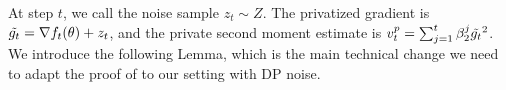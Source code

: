 \documentclass[letterpaper]{article} %
\newtheorem{lemma}[theorem]{Lemma}
\def\cN{\mathcal{N}}
\begin{document}
At step $t$, we call the noise sample $z_t \sim Z$. The privatized gradient is $\Tilde{g_t} = \nabla f_t(\theta) + z_t$, and the private second moment estimate is $v_t^p=\sum_{j=1}^{t}\beta_2^{j}\Tilde{g_t}^2$. We introduce the following Lemma, which is the main technical change we need to adapt the proof of \citet{défossez2022simple} to our setting with DP noise.
\end{document}
